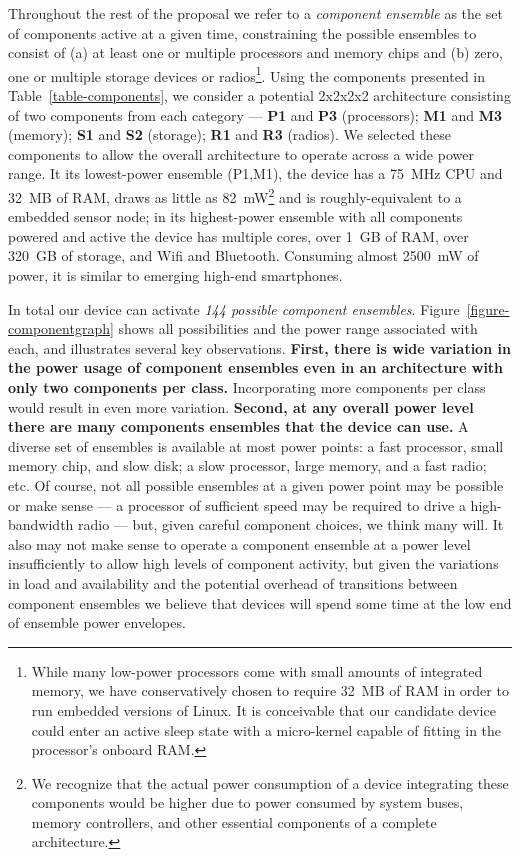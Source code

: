 Throughout the rest of the proposal we refer to a \textit{component ensemble}
as the set of components active at a given time, constraining the possible
ensembles to consist of (a) at least one or multiple processors and memory
chips and (b) zero, one or multiple storage devices or radios\footnote{While
many low-power processors come with small amounts of integrated memory, we
have conservatively chosen to require 32~MB of RAM in order to run embedded
versions of Linux. It is conceivable that our candidate device could enter an
active sleep state with a micro-kernel capable of fitting in the processor's
onboard RAM.}. Using the components presented in
Table~\ref{table-components}, we consider a potential 2x2x2x2 architecture
consisting of two components from each category --- \textbf{P1} and
\textbf{P3} (processors); \textbf{M1} and \textbf{M3} (memory); \textbf{S1}
and \textbf{S2} (storage); \textbf{R1} and \textbf{R3} (radios). We selected
these components to allow the overall architecture to operate across a wide
power range. It its lowest-power ensemble (P1,M1), the device has a 75~MHz
CPU and 32~MB of RAM, draws as little as 82~mW\footnote{We recognize that the
actual power consumption of a device integrating these components would be
higher due to power consumed by system buses, memory controllers, and other
essential components of a complete architecture.} and is roughly-equivalent
to a embedded sensor node; in its highest-power ensemble with all components
powered and active the device has multiple cores, over 1~GB of RAM, over
320~GB of storage, and Wifi and Bluetooth. Consuming almost 2500~mW of power,
it is similar to emerging high-end smartphones.

In total our device can activate \textit{144 possible component ensembles}.
Figure~\ref{figure-componentgraph} shows all possibilities and the power
range associated with each, and illustrates several key observations.
\textbf{First, there is wide variation in the power usage of component
ensembles even in an architecture with only two components per class.}
Incorporating more components per class would result in even more variation.
\textbf{Second, at any overall power level there are many components
ensembles that the device can use.} A diverse set of ensembles is available
at most power points: a fast processor, small memory chip, and slow disk; a
slow processor, large memory, and a fast radio; etc. Of course, not all
possible ensembles at a given power point may be possible or make sense --- a
processor of sufficient speed may be required to drive a high-bandwidth radio
--- but, given careful component choices, we think many will. It also may not
make sense to operate a component ensemble at a power level insufficiently to
allow high levels of component activity, but given the variations in load and
availability and the potential overhead of transitions between component
ensembles we believe that devices will spend some time at the low end of
ensemble power envelopes.

